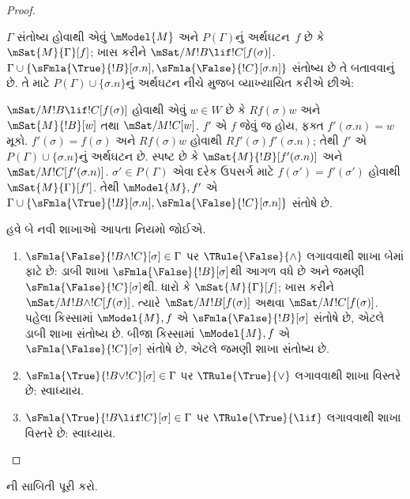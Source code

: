 \begin{proof}
\begin{enumerate}
  $\Gamma$ સંતોષ્ય હોવાથી એવું
  $\mModel{M}$ અને $P(\Gamma)$નું અર્થઘટન~$f$
  છે કે $\mSat{M}{\Gamma}[f]$; ખાસ કરીને
  $\mSat/{M}{!B \lif !C}[f(\sigma)]$.
  $\Gamma \cup \{\sFmla{\True}{!B}[\sigma.n],
  \sFmla{\False}{!C}[\sigma.n]\}$ સંતોષ્ય છે
  તે બતાવવાનું છે. તે માટે $P(\Gamma)
  \cup \{\sigma.n\}$નું અર્થઘટન નીચે મુજબ
  વ્યાખ્યાયિત કરીએ છીએ:

  $\mSat/{M}{!B \lif !C}[f(\sigma)]$
  હોવાથી એવું $w \in W$ છે કે $Rf(\sigma)w$
  અને $\mSat{M}{!B}[w]$ તથા
  $\mSat/{M}{!C}[w]$. $f'$ એ $f$ જેવું જ હોય,
  ફક્ત $f'(\sigma.n) = w$ મૂકો.
  $f'(\sigma) = f(\sigma)$ અને $Rf(\sigma)w$
  હોવાથી $Rf'(\sigma)f'(\sigma.n)$; તેથી
  $f'$ એ $P(\Gamma) \cup \{\sigma.n\}$નું
  અર્થઘટન છે. સ્પષ્ટ છે કે
  $\mSat{M}{!B}[f'(\sigma.n)]$ અને
  $\mSat/{M}{!C}[f'(\sigma.n)]$.
  $\sigma' \in P(\Gamma)$ એવા દરેક ઉપસર્ગ માટે
  $f(\sigma') = f'(\sigma')$ હોવાથી
  $\mSat{M}{\Gamma}[f']$. તેથી $\mModel{M}, f'$
  એ $\Gamma \cup \{\sFmla{\True}{!B}[\sigma.n],
  \sFmla{\False}{!C}[\sigma.n]\}$ સંતોષે છે.
\end{enumerate}
હવે બે નવી શાખાઓ આપતા નિયમો જોઈએ.
\begin{enumerate}
\item $\sFmla{\False}{!B \land !C}[\sigma] \in \Gamma$
  પર $\TRule{\False}{\land}$ લગાવવાથી
  શાખા બેમાં ફાટે છે: ડાબી શાખા
  $\sFmla{\False}{!B}[\sigma]$થી આગળ વધે છે
  અને જમણી $\sFmla{\False}{!C}[\sigma]$થી.
  ધારો કે $\mSat{M}{\Gamma}[f]$; ખાસ કરીને
  $\mSat/{M}{!B \land !C}[f(\sigma)]$.
  ત્યારે $\mSat/{M}{!B}[f(\sigma)]$ અથવા
  $\mSat/{M}{!C}[f(\sigma)]$. પહેલા કિસ્સામાં
  $\mModel{M}, f$ એ $\sFmla{\False}{!B}[\sigma]$
  સંતોષે છે, એટલે ડાબી શાખા સંતોષ્ય છે.
  બીજા કિસ્સામાં $\mModel{M}, f$ એ
  $\sFmla{\False}{!C}[\sigma]$ સંતોષે છે,
  એટલે જમણી શાખા સંતોષ્ય છે.
\item $\sFmla{\True}{!B \lor !C}[\sigma] \in \Gamma$
  પર $\TRule{\True}{\lor}$ લગાવવાથી શાખા
  વિસ્તરે છે: સ્વાધ્યાય.
\item $\sFmla{\True}{!B \lif !C}[\sigma] \in \Gamma$
  પર $\TRule{\True}{\lif}$ લગાવવાથી શાખા
  વિસ્તરે છે: સ્વાધ્યાય.
\end{enumerate}
\end{proof}

\begin{prob}
ની
સાબિતી પૂરી કરો.
\end{prob}

